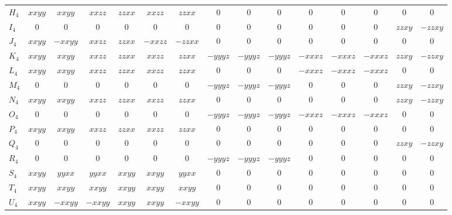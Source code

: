 \documentclass[a4paper,11pt]{article}
\begin{document}
\begin{landscape}
{\begin{tabular}{@{}l c c c c c c c c c c c c c c@{}}
$H_4$ & $xxyy$ & $xxyy$ & $xxzz$ & $zzxx$ & $xxzz$ & $zzxx$ & $0$ & $0$ & $0$ & $0$ & $0$ & $0$ & $0$ & $0$ \\
$I_4$ & $0$ & $0$ & $0$ & $0$ & $0$ & $0$ & $0$ & $0$ & $0$ & $0$ & $0$ & $0$ & $zzxy$ & $-zzxy$ \\
$J_4$ & $xxyy$ & $-xxyy$ & $xxzz$ & $zzxx$ & $-xxzz$ & $-zzxx$ & $0$ & $0$ & $0$ & $0$ & $0$ & $0$ & $0$ & $0$ \\
$K_4$ & $xxyy$ & $xxyy$ & $xxzz$ & $zzxx$ & $xxzz$ & $zzxx$ & $-yyyz$ & $-yyyz$ & $-yyyz$ & $-xxxz$ & $-xxxz$ & $-xxxz$ & $zzxy$ & $-zzxy$ \\
$L_4$ & $xxyy$ & $xxyy$ & $xxzz$ & $zzxx$ & $xxzz$ & $zzxx$ & $0$ & $0$ & $0$ & $-xxxz$ & $-xxxz$ & $-xxxz$ & $0$ & $0$ \\
$M_4$ & $0$ & $0$ & $0$ & $0$ & $0$ & $0$ & $-yyyz$ & $-yyyz$ & $-yyyz$ & $0$ & $0$ & $0$ & $zzxy$ & $-zzxy$ \\
$N_4$ & $xxyy$ & $xxyy$ & $xxzz$ & $zzxx$ & $xxzz$ & $zzxx$ & $0$ & $0$ & $0$ & $0$ & $0$ & $0$ & $zzxy$ & $-zzxy$ \\
$O_4$ & $0$ & $0$ & $0$ & $0$ & $0$ & $0$ & $-yyyz$ & $-yyyz$ & $-yyyz$ & $-xxxz$ & $-xxxz$ & $-xxxz$ & $0$ & $0$ \\
$P_4$ & $xxyy$ & $xxyy$ & $xxzz$ & $zzxx$ & $xxzz$ & $zzxx$ & $0$ & $0$ & $0$ & $0$ & $0$ & $0$ & $0$ & $0$ \\
$Q_4$ & $0$ & $0$ & $0$ & $0$ & $0$ & $0$ & $0$ & $0$ & $0$ & $0$ & $0$ & $0$ & $zzxy$ & $-zzxy$ \\
$R_4$ & $0$ & $0$ & $0$ & $0$ & $0$ & $0$ & $-yyyz$ & $-yyyz$ & $-yyyz$ & $0$ & $0$ & $0$ & $0$ & $0$ \\
$S_4$ & $xxyy$ & $yyxx$ & $yyxx$ & $xxyy$ & $xxyy$ & $yyxx$ & $0$ & $0$ & $0$ & $0$ & $0$ & $0$ & $0$ & $0$ \\
$T_4$ & $xxyy$ & $xxyy$ & $xxyy$ & $xxyy$ & $xxyy$ & $xxyy$ & $0$ & $0$ & $0$ & $0$ & $0$ & $0$ & $0$ & $0$ \\
$U_4$ & $xxyy$ & $-xxyy$ & $-xxyy$ & $xxyy$ & $xxyy$ & $-xxyy$ & $0$ & $0$ & $0$ & $0$ & $0$ & $0$ & $0$ & $0$ \\
\bottomrule
\end{tabular}
}
\end{landscape}
\end{document}
